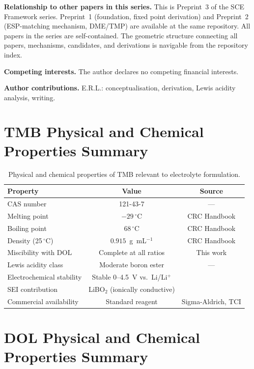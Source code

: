 \documentclass[11pt]{article}
\theoremstyle{plain}
\theoremstyle{definition}
\theoremstyle{remark}
\begin{document}
\noindent\textbf{Relationship to other papers in this series.}
This is Preprint~3 of the SCE Framework series.
Preprint~1 (foundation, fixed point derivation) and Preprint~2
(ESP-matching mechanism, DME/TMP) are available at the same repository.
All papers in the series are self-contained.  The geometric structure
connecting all papers, mechanisms, candidates, and derivations is
navigable from the repository index.

\noindent\textbf{Competing interests.}
The author declares no competing financial interests.

\noindent\textbf{Author contributions.}
E.R.L.: conceptualisation, derivation, Lewis acidity analysis, writing.

\appendix

\section{TMB Physical and Chemical Properties Summary}
\label{app:TMB_props}

\begin{table}[h!]
\centering
\caption{Physical and chemical properties of TMB relevant to electrolyte
formulation.}
\label{tab:TMB_props}
\begin{tabular}{lcc}
\toprule
Property & Value & Source \\
\midrule
CAS number & 121-43-7 & --- \\
Melting point & $-29\,^\circ$C & CRC Handbook \cite{CRC2024} \\
Boiling point & $68\,^\circ$C & CRC Handbook \cite{CRC2024} \\
Density (25\,$^\circ$C) & $0.915$~g~mL$^{-1}$ &
  CRC Handbook \cite{CRC2024} \\
Miscibility with DOL & Complete at all ratios & This work \\
Lewis acidity class & Moderate boron ester & --- \\
Electrochemical stability & Stable 0--4.5~V vs.\ Li/Li$^+$ &
  \cite{Liu2021} \\
SEI contribution & LiBO$_2$ (ionically conductive) & \cite{Liu2021} \\
Commercial availability & Standard reagent & Sigma-Aldrich, TCI \\
\bottomrule
\end{tabular}
\end{table}

\section{DOL Physical and Chemical Properties Summary}
\label{app:DOL_props}
\end{document}
